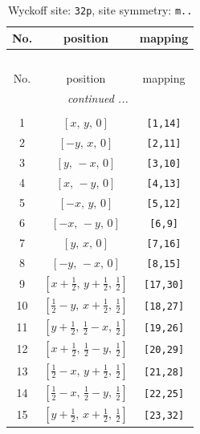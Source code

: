 \documentclass[fleqn,8pt]{jsarticle}
\begin{document}
\renewcommand{\arraystretch}{1.2}
\begin{longtable}{ccc}
\caption{Wyckoff site: {\tt 32p}, site symmetry: {\tt m..}}
 \\
 \hline \hline
No. & position & mapping \\ \hline \endfirsthead

\multicolumn{2}{l}{\tablename\ \thetable{}} \\
 \hline \hline
No. & position & mapping \\ \hline \endhead

 \hline \hline
\multicolumn{2}{r}{\footnotesize\it continued ...} \\ \endfoot

 \hline \hline
\multicolumn{2}{r}{} \\ \endlastfoot

1 & $\left[ x,\, y,\, 0 \right]$ & {\tt [1,14]} \\ \hline
2 & $\left[ - y,\, x,\, 0 \right]$ & {\tt [2,11]} \\ \hline
3 & $\left[ y,\, - x,\, 0 \right]$ & {\tt [3,10]} \\ \hline
4 & $\left[ x,\, - y,\, 0 \right]$ & {\tt [4,13]} \\ \hline
5 & $\left[ - x,\, y,\, 0 \right]$ & {\tt [5,12]} \\ \hline
6 & $\left[ - x,\, - y,\, 0 \right]$ & {\tt [6,9]} \\ \hline
7 & $\left[ y,\, x,\, 0 \right]$ & {\tt [7,16]} \\ \hline
8 & $\left[ - y,\, - x,\, 0 \right]$ & {\tt [8,15]} \\ \hline
9 & $\left[ x + \frac{1}{2},\, y + \frac{1}{2},\, \frac{1}{2} \right]$ & {\tt [17,30]} \\ \hline
10 & $\left[ \frac{1}{2} - y,\, x + \frac{1}{2},\, \frac{1}{2} \right]$ & {\tt [18,27]} \\ \hline
11 & $\left[ y + \frac{1}{2},\, \frac{1}{2} - x,\, \frac{1}{2} \right]$ & {\tt [19,26]} \\ \hline
12 & $\left[ x + \frac{1}{2},\, \frac{1}{2} - y,\, \frac{1}{2} \right]$ & {\tt [20,29]} \\ \hline
13 & $\left[ \frac{1}{2} - x,\, y + \frac{1}{2},\, \frac{1}{2} \right]$ & {\tt [21,28]} \\ \hline
14 & $\left[ \frac{1}{2} - x,\, \frac{1}{2} - y,\, \frac{1}{2} \right]$ & {\tt [22,25]} \\ \hline
15 & $\left[ y + \frac{1}{2},\, x + \frac{1}{2},\, \frac{1}{2} \right]$ & {\tt [23,32]} \\ \hline

\end{longtable}
\end{document}
